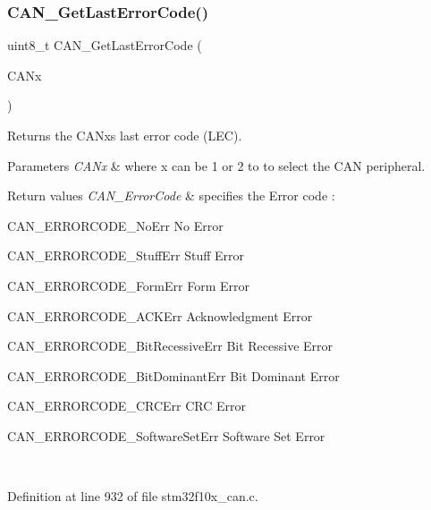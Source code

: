 \subsubsection{\texorpdfstring{C\+A\+N\+\_\+\+Get\+Last\+Error\+Code()}{CAN\_GetLastErrorCode()}}
{\footnotesize\ttfamily uint8\+\_\+t C\+A\+N\+\_\+\+Get\+Last\+Error\+Code (\begin{DoxyParamCaption}\item[{\hyperlink{struct_c_a_n___type_def}{C\+A\+N\+\_\+\+Type\+Def} $\ast$}]{C\+A\+Nx }\end{DoxyParamCaption})}



Returns the C\+A\+Nx\textquotesingle{}s last error code (L\+EC). 


\begin{DoxyParams}{Parameters}
{\em C\+A\+Nx} & where x can be 1 or 2 to to select the C\+AN peripheral. \\
\hline
\end{DoxyParams}

\begin{DoxyRetVals}{Return values}
{\em C\+A\+N\+\_\+\+Error\+Code} & specifies the Error code \+:
\begin{DoxyItemize}
\item C\+A\+N\+\_\+\+E\+R\+R\+O\+R\+C\+O\+D\+E\+\_\+\+No\+Err No Error
\item C\+A\+N\+\_\+\+E\+R\+R\+O\+R\+C\+O\+D\+E\+\_\+\+Stuff\+Err Stuff Error
\item C\+A\+N\+\_\+\+E\+R\+R\+O\+R\+C\+O\+D\+E\+\_\+\+Form\+Err Form Error
\item C\+A\+N\+\_\+\+E\+R\+R\+O\+R\+C\+O\+D\+E\+\_\+\+A\+C\+K\+Err Acknowledgment Error
\item C\+A\+N\+\_\+\+E\+R\+R\+O\+R\+C\+O\+D\+E\+\_\+\+Bit\+Recessive\+Err Bit Recessive Error
\item C\+A\+N\+\_\+\+E\+R\+R\+O\+R\+C\+O\+D\+E\+\_\+\+Bit\+Dominant\+Err Bit Dominant Error
\item C\+A\+N\+\_\+\+E\+R\+R\+O\+R\+C\+O\+D\+E\+\_\+\+C\+R\+C\+Err C\+RC Error
\item C\+A\+N\+\_\+\+E\+R\+R\+O\+R\+C\+O\+D\+E\+\_\+\+Software\+Set\+Err Software Set Error 
\end{DoxyItemize}\\
\hline
\end{DoxyRetVals}


Definition at line 932 of file stm32f10x\+\_\+can.\+c.

\mbox{\label{group___c_a_n___private___functions_ga85ee0c35bf7ca15d4e4c862eef534843}} 
